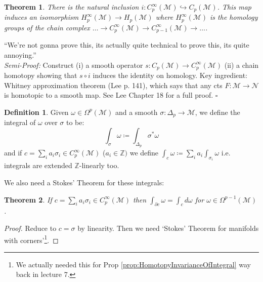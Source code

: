 \documentclass[10pt]{article}
\theoremstyle{plain}
\newtheorem{theorem}{Theorem}[section]
\theoremstyle{definition}
\newtheorem{defn}[thm]{Definition} %
\newenvironment{semiproof}{\textit{Semi-Proof:}}{\hfill$\square$}
\newcommand{\man}{\mathcal{M}}
\newcommand{\nan}{\mathcal{N}}
\newcommand{\pformman}[1]{\Omega^{#1}(\man)}
\newcommand{\dw}{d\omega}
\newcommand{\Zint}{\mathbb{Z}}
\begin{document}
\begin{theorem}
    There is the natural inclusion $i:C^\infty_p(\man)\hookrightarrow C_p(\man)$. This map induces an isomorphism $H^\infty _p (\man) \to H_p(\man)$ where $H^\infty_p(\man)$ is the homology groups of the chain complex $\ldots \to C_p^\infty(\man) \to C_{p-1}^\infty(\man)\to \ldots$.
\end{theorem}
``We're not gonna prove this, its actually quite technical to prove this, its quite annoying.''\\
\begin{semiproof}
    Construct (i) a smooth operator $s: C_p(\man) \to C_p^\infty(\man)$ (ii) a chain homotopy showing that $s\circ i$ induces the identity on homology. Key ingredient: Whitney approximation theorem (Lee p. 141), which says that any cts $F:\man \to \nan$ is homotopic to a smooth map. See Lee Chapter 18 for a full proof.
\end{semiproof}
\begin{defn}
    Given $\omega \in \pformman{p}$ and a smooth $\sigma: \Delta_p \to \man$, we define the integral of $\omega$ over $\sigma$ to be:
$$\int_\sigma \omega \coloneqq \int_{\Delta_p} \sigma^* \omega$$
and if $c = \sum_i a_i \sigma_i \in C_p^\infty(\man)$ ($a_i\in\Zint)$ we define $\int_c \omega \coloneqq \sum_i a_i \int_{\sigma_i} \omega$ i.e. integrals are extended $\Zint$-linearly too.
\end{defn}

We also need a Stokes' Theorem for these integrals:
\begin{theorem}
    If $c = \sum_i a_i \sigma_i \in C_p^\infty(\man) $ then $\int_{\partial c} \omega = \int_c \dw$ for $\omega \in \pformman{p-1}$.
\end{theorem}
\begin{proof}
    Reduce to $c = \sigma$ by linearity. Then we need `Stokes' Theorem for manifolds with corners'\footnote{We actually needed this for Prop \ref{prop:HomotopyInvarianceOfIntegral} way back in lecture 7.}.
\end{proof}
\end{document}
